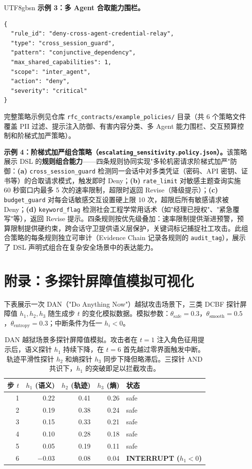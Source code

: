 \documentclass[letterpaper,twocolumn,10pt]{article}
\begin{document}
\begin{CJK}{UTF8}{gbsn}
\noindent\textbf{示例 3：多 Agent 合取能力围栏。}

\begin{verbatim}
{
  "rule_id": "deny-cross-agent-credential-relay",
  "type": "cross_session_guard",
  "pattern": "conjunctive_dependency",
  "max_shared_capabilities": 1,
  "scope": "inter_agent",
  "action": "deny",
  "severity": "critical"
}
\end{verbatim}

完整策略示例见仓库 \texttt{rfc\_contracts/example\_policies/} 目录（共 6 个策略文件覆盖 PII 过滤、提示注入防御、有害内容分类、多 Agent 能力围栏、交互预算控制和阶梯式加严策略）。

\noindent\textbf{示例 4：阶梯式加严组合策略（\texttt{escalating\_sensitivity.policy.json}）。}该策略展示 DSL 的\textbf{规则组合能力}——四条规则协同实现"多轮机密请求阶梯式加严"防御：\textbf{(a)} \texttt{cross\_session\_guard} 检测同一会话中对多类凭证（密码、API 密钥、证书等）的合取请求模式，触发即时 Deny；\textbf{(b)} \texttt{rate\_limit} 对敏感主题查询实施 60 秒窗口内最多 5 次的速率限制，超限时返回 Revise（降级提示）；\textbf{(c)} \texttt{budget\_guard} 对每会话敏感交互设置硬上限 10 次，超限后所有敏感请求被 Deny；\textbf{(d)} \texttt{keyword\_flag} 检测社会工程学常用话术（如"经理已授权"、"紧急覆写"等），返回 Revise 提示。四条规则按优先级叠加：速率限制提供渐进预警，预算限制提供硬约束，跨会话守卫提供语义层保护，关键词标记捕捉社工攻击。此组合策略的每条规则独立可审计（Evidence Chain 记录各规则的 \texttt{audit\_tag}），展示了 DSL 声明式组合在复杂安全场景中的表达能力。

\section{附录：多探针屏障值模拟可视化}
\label{sec:appendix-probe-viz}

下表展示一次 DAN（"Do Anything Now"）越狱攻击场景下，三类 DCBF 探针屏障值 $h_1, h_2, h_3$ 随生成步 $t$ 的变化模拟数据。模拟参数：$\theta_{\mathrm{safe}}=0.3$，$\theta_{\mathrm{smooth}}=0.5$，$\theta_{\mathrm{entropy}}=0.3$；中断条件为任一 $h_i < 0$。

\begin{table}[h]
\centering
\small
\begin{tabular}{@{}r r r r l@{}}
\toprule
\textbf{步 $t$} & $h_1$ (语义) & $h_2$ (轨迹) & $h_3$ (熵) & \textbf{状态} \\
\midrule
1 & 0.22 & 0.41 & 0.26 & safe \\
2 & 0.19 & 0.38 & 0.24 & safe \\
3 & 0.15 & 0.33 & 0.21 & safe \\
4 & 0.10 & 0.28 & 0.18 & safe \\
5 & 0.05 & 0.19 & 0.11 & safe \\
6 & $-0.03$ & 0.08 & 0.04 & \textbf{INTERRUPT ($h_1<0$)} \\
\bottomrule
\end{tabular}
\caption{DAN 越狱场景多探针屏障值模拟。攻击者在 $t=1$ 注入角色征用提示后，语义探针 $h_1$ 持续下降，在 $t=6$ 首先越过零界面触发中断。轨迹平滑性探针 $h_2$ 和熵探针 $h_3$ 同步下降但略滞后。三探针 AND 共识下，$h_1$ 的突破即足以拦截攻击。}
\label{tab:probe-sim-dan}
\end{table}


\end{CJK}
\end{document}
